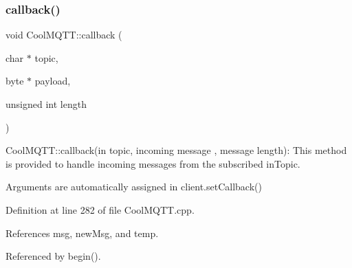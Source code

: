 \subsubsection{\texorpdfstring{callback()}{callback()}}
{\footnotesize\ttfamily void Cool\+M\+Q\+T\+T\+::callback (\begin{DoxyParamCaption}\item[{char $\ast$}]{topic,  }\item[{byte $\ast$}]{payload,  }\item[{unsigned int}]{length }\end{DoxyParamCaption})}

Cool\+M\+Q\+T\+T\+::callback(in topic, incoming message , message length)\+: This method is provided to handle incoming messages from the subscribed in\+Topic.

Arguments are automatically assigned in client.\+set\+Callback() 

Definition at line 282 of file Cool\+M\+Q\+T\+T.\+cpp.



References msg, new\+Msg, and temp.



Referenced by begin().


